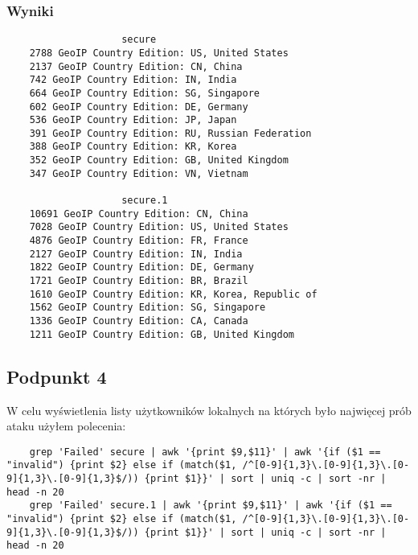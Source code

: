 \documentclass{article}
\begin{document}
\subsubsection{Wyniki}
\begin{verbatim}
                    secure                                   
    2788 GeoIP Country Edition: US, United States  
    2137 GeoIP Country Edition: CN, China                  
    742 GeoIP Country Edition: IN, India           
    664 GeoIP Country Edition: SG, Singapore       
    602 GeoIP Country Edition: DE, Germany         
    536 GeoIP Country Edition: JP, Japan           
    391 GeoIP Country Edition: RU, Russian Federation
    388 GeoIP Country Edition: KR, Korea           
    352 GeoIP Country Edition: GB, United Kingdom  
    347 GeoIP Country Edition: VN, Vietnam         
    
                    secure.1
    10691 GeoIP Country Edition: CN, China
    7028 GeoIP Country Edition: US, United States
    4876 GeoIP Country Edition: FR, France
    2127 GeoIP Country Edition: IN, India
    1822 GeoIP Country Edition: DE, Germany
    1721 GeoIP Country Edition: BR, Brazil
    1610 GeoIP Country Edition: KR, Korea, Republic of
    1562 GeoIP Country Edition: SG, Singapore
    1336 GeoIP Country Edition: CA, Canada
    1211 GeoIP Country Edition: GB, United Kingdom
\end{verbatim}
\subsection{Podpunkt 4}
W celu wyświetlenia listy użytkowników lokalnych na których było najwięcej prób ataku użyłem polecenia:
\begin{verbatim}
    grep 'Failed' secure | awk '{print $9,$11}' | awk '{if ($1 == "invalid") {print $2} else if (match($1, /^[0-9]{1,3}\.[0-9]{1,3}\.[0-9]{1,3}\.[0-9]{1,3}$/)) {print $1}}' | sort | uniq -c | sort -nr | head -n 20
    grep 'Failed' secure.1 | awk '{print $9,$11}' | awk '{if ($1 == "invalid") {print $2} else if (match($1, /^[0-9]{1,3}\.[0-9]{1,3}\.[0-9]{1,3}\.[0-9]{1,3}$/)) {print $1}}' | sort | uniq -c | sort -nr | head -n 20
\end{verbatim}
\end{document}
